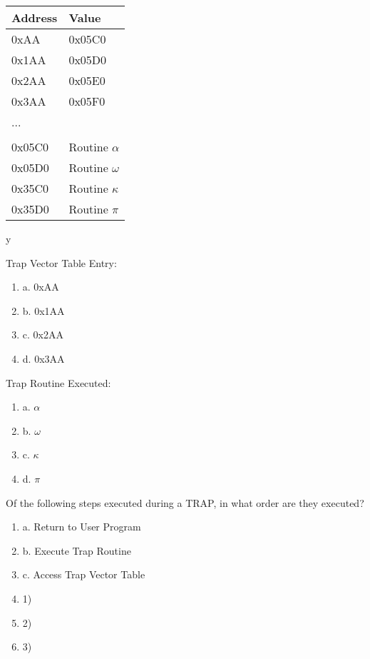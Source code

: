 \documentclass{article}
\begin{document}
\begin{enumerate}[label=(\alph*)]
\begin{center}
\begin{tabular}{||c  ||}
\end{tabular}

\begin{tabular}{|p{3cm} p{3cm} |} 
\hline
 Address & Value  \\ [0.5ex] 
 \hline\hline
 0xAA & 0x05C0 \\ 
 \hline
 0x1AA & 0x05D0 \\
 \hline
 0x2AA & 0x05E0 \\
 \hline
 0x3AA & 0x05F0 \\
 \hline
 ... &  \\ [1ex]
 \hline
  & \\ [1ex]
  \hline
  0x05C0 & Routine $\alpha$ \\
  \hline
  0x05D0 & Routine $\omega$\\
  \hline
  0x35C0 & Routine $\kappa$ \\
  \hline
  0x35D0 & Routine $\pi$ \\
 \hline
 
\end{tabular}y




\end{center}

Trap Vector Table Entry:

\begin{enumerate}[label={}]
    \item a. 0xAA
    \item b. 0x1AA
    \item c. 0x2AA
    \item d. 0x3AA

    \end{enumerate}

Trap Routine Executed:

\begin{enumerate}[label={}]
    \item a. $\alpha$ 
    \item b. $\omega$
    \item c. $\kappa$
    \item d. $\pi$
\end{enumerate}

Of the following steps executed during a TRAP, in what order are they executed?
\begin{enumerate}[label={}]
    
\item a. Return to User Program
\item b. Execute Trap Routine
\item c. Access Trap Vector Table
\newline
\item 1)
\item 2)
\item 3)

\end{enumerate}
\end{enumerate}
\end{document}
